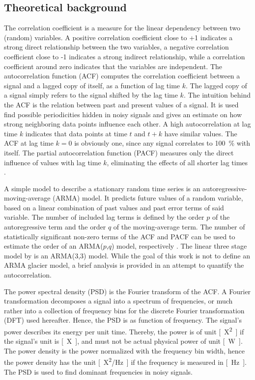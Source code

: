     \subsection{Theoretical background} %
    \label{sub:theoretical_background}

        The correlation coefficient is a measure for the linear dependency between two (random) variables. A positive correlation coefficient close to +1 indicates a strong direct relationship between the two variables, a negative correlation coefficient close to -1 indicates a strong indirect relationship, while a correlation coefficient around zero indicates that the variables are independent. The autocorrelation function (ACF) computes the correlation coefficient between a signal and a lagged copy of itself, as a function of lag time $k$. The lagged copy of a signal simply refers to the signal shifted by the lag time $k$. The intuition behind the ACF is the relation between past and present values of a signal. It is used find possible periodicities hidden in noisy signals and gives an estimate on how strong neighboring data points influence each other. A high autocorrelation at lag time $k$ indicates that data points at time $t$ and $t+k$ have similar values. The ACF at lag time $k=0$ is obviously one, since any signal correlates to \SI{100}{\percent} with itself. The partial autocorrelation function (PACF) measures only the direct influence of values with lag time $k$, eliminating the effects of all shorter lag times \citep{BoxJenkins2015}.

        A simple model to describe a stationary random time series is an autoregressive-moving-average (ARMA) model. It predicts future values of a random variable, based on a linear combination of past values and past error terms of said variable. The number of included lag terms is defined by the order $p$ of the autoregressive term and the order $q$ of the moving-average term. The number of statistically significant non-zero terms of the ACF and PACF can be used to estimate the order of an ARMA($p$,$q$) model, respectively \citep{BoxJenkins2015}. The linear three stage model by \citet{Roe2014} is an ARMA(3,3) model. While the goal of this work is not to define an ARMA glacier model, a brief analysis is provided in an attempt to quantify the autocorrelation.
        
        The power spectral density (PSD) is the Fourier transform of the ACF. A Fourier transformation decomposes a signal into a spectrum of frequencies, or much rather into a collection of frequency bins for the discrete Fourier transformation (DFT) used hereafter. Hence, the PSD is as function of frequency. The signal's power describes its energy per unit time. Thereby, the power is of unit \si{[X^2]} if the signal's unit is \si{[X]}, and must not be actual physical power of unit \si{[\watt]}. The power density is the power normalized with the frequency bin width, hence the power density has the unit \si{[X^2/\hertz]} if the frequency is measured in \si{[\hertz]}. The PSD is used to find dominant frequencies in noisy signals.
    

